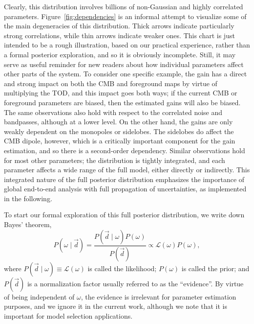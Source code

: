 \documentclass[onecolumn]{aa}
\renewcommand{\d}[0]{\vec{d}}
\begin{document}
Clearly, this distribution involves billions of non-Gaussian and
highly correlated parameters. Figure~\ref{fig:dependencies} is an
informal attempt to visualize some of the main degeneracies of this
distribution. Thick arrows indicate particularly strong correlations,
while thin arrows indicate weaker ones. This chart is just intended to be a
rough illustration, based on our practical experience, rather than a
formal posterior exploration, and so it is obviously
incomplete. Still, it may serve as useful reminder for new readers
about how individual parameters affect other parts of the system. To
consider one specific example, the gain has a direct and strong impact
on both the CMB and foreground maps by virtue of multiplying the TOD,
and this impact goes both ways; if the current CMB or foreground
parameters are biased, then the estimated gains will also be
biased. The same observations also hold with respect to the correlated
noise and bandpasses, although at a lower level. On the other hand,
the gains are only weakly dependent on the monopoles or sidelobes. The
sidelobes do affect the CMB dipole, however, which is a critically
important component for the gain estimation, and so there is a
second-order dependency. Similar observations hold for most
other parameters; the distribution is tightly integrated, and
each parameter affects a wide range of the full model, either directly
or indirectly. This integrated nature of the full posterior
distribution emphasizes the importance of global end-to-end analysis
with full propagation of uncertainties, as implemented in the
following.

To start our formal exploration of this full posterior distribution,
we write down Bayes' theorem,
\begin{equation}
  P(\omega\mid \d) = \frac{P(\d\mid \omega)P(\omega)}{P(\d)} \propto
  \mathcal{L}(\omega)P(\omega),
  \label{eq:jointpost}
\end{equation}
where $P(\d\mid \omega)\equiv\mathcal{L}(\omega)$ is called the
likelihood; $P(\omega)$ is called the prior; and $P(\d)$ is a
normalization factor usually referred to as the ``evidence''. By
virtue of being independent of $\omega$, the evidence is irrelevant
for parameter estimation purposes, and we ignore it in the current work,
although we note that it is important for model selection
applications.
\end{document}
